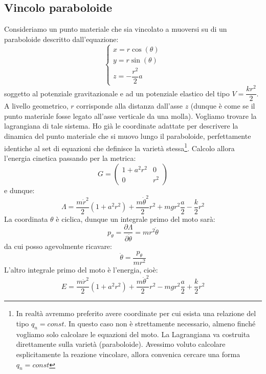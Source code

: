 \documentclass[a4paper,openany]{article}
\begin{document}
	\subsection{Vincolo paraboloide}
	Consideriamo un punto materiale che sia vincolato a muoversi su di un paraboloide descritto dall'equazione:
	\begin{equation}
		\begin{cases}
			x = r\cos(\theta) \\
			y = r\sin(\theta)\\
			z = -\dfrac{r^{2}}{2}a
		\end{cases}
	\end{equation}
	soggetto al potenziale gravitazionale e ad un potenziale elastico del tipo $V = \dfrac{kr^{2}}{2}$. A livello geometrico, $r$ corrisponde alla distanza dall'asse $z$ (dunque è come se il punto materiale fosse legato all'asse verticale da una molla). Vogliamo trovare la lagrangiana di tale sistema. Ho già le coordinate adattate per descrivere la dinamica del punto materiale che si muovo lungo il paraboloide, perfettamente identiche al set di equazioni che definisce la varietà stessa\footnote{In realtà avremmo preferito avere coordinate per cui esista una relazione del tipo $q_n = const$. In questo caso non è strettamente necessario, almeno finché vogliamo solo calcolare le equazioni del moto. La Lagrangiana va costruita direttamente sulla varietà (paraboloide). Avessimo voluto calcolare esplicitamente la reazione vincolare, allora convenica cercare una forma $q_n = const$}. Calcolo allora l'energia cinetica passando per la metrica:
	\begin{equation}
		G =
		\begin{pmatrix}
			1+a^{2}r^{2} & 0 \\
			0 & r^{2}
		\end{pmatrix}
	\end{equation}
	e dunque:
	\begin{equation}
		\Lambda = \dfrac{m\dot{r}^{2}}{2}(1+a^{2}r^{2}) + \dfrac{m\dot{\theta}^{2}}{2}r^{2} + mgr^{2}\dfrac{a}{2} -  \dfrac{k}{2}r^{2}
	\end{equation}
	La coordinata $\theta$ è ciclica, dunque un integrale primo del moto sarà:
	$$
	p_{\theta} = \dfrac{\partial \Lambda}{\partial \dot{\theta}} = mr^{2}\dot{\theta}
	$$
	da cui posso agevolmente ricavare:
	$$
	\dot{\theta} = \dfrac{p_{\theta}}{mr^{2}}
	$$
	L'altro integrale primo del moto è l'energia, cioè:
	$$
	E =  \dfrac{m\dot{r}^{2}}{2}(1+a^{2}r^{2}) + \dfrac{m\dot{\theta}^{2}}{2}r^{2} - mgr^{2}\dfrac{a}{2} +  \dfrac{k}{2}r^{2}
	$$
\end{document}

